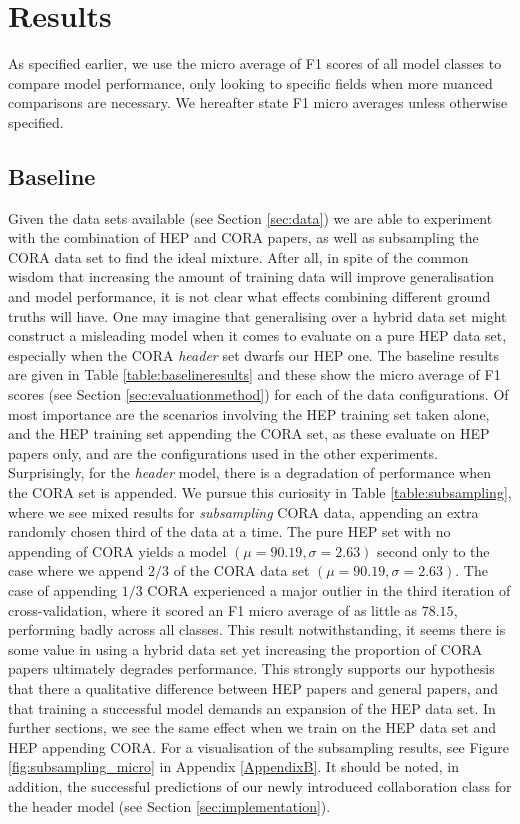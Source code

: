 \section{Results}
\label{sec:results}

As specified earlier, we use the micro average of F1 scores of all model classes to compare model performance, only looking to specific fields when more nuanced comparisons are necessary. We hereafter state F1 micro averages unless otherwise specified.

\subsection{Baseline}
\label{subsec:baslineresults}

Given the data sets available (see Section \ref{sec:data}) we are able to experiment with the combination of HEP and CORA papers, as well as subsampling the CORA data set to find the ideal mixture. After all, in spite of the common wisdom that increasing the amount of training data will improve generalisation and model performance, it is not clear what effects combining different ground truths will have. One may imagine that generalising over a hybrid data set might construct a misleading model when it comes to evaluate on a pure HEP data set, especially when the CORA \emph{header} set dwarfs our HEP one. The baseline results are given in Table \ref{table:baselineresults} and these show the micro average of F1 scores (see Section \ref{sec:evaluationmethod}) for each of the data configurations. Of most importance are the scenarios involving the HEP training set taken alone, and the HEP training set appending the CORA set, as these evaluate on HEP papers only, and are the configurations used in the other experiments. Surprisingly, for the \emph{header} model, there is a degradation of performance when the CORA set is appended. We pursue this curiosity in Table \ref{table:subsampling}, where we see mixed results for \emph{subsampling} CORA data, appending an extra randomly chosen third of the data at a time. The pure HEP set with no appending of CORA yields a model $(\mu = 90.19, \sigma = 2.63)$ second only to the case where we append $2/3$ of the CORA data set $(\mu = 90.19, \sigma = 2.63)$. The case of appending $1/3$ CORA experienced a major outlier in the third iteration of cross-validation, where it scored an F1 micro average of as little as $78.15$, performing badly across all classes. This result notwithstanding, it seems there is some value in using a hybrid data set yet increasing the proportion of CORA papers ultimately degrades performance. This strongly supports our hypothesis that there a qualitative difference between HEP papers and general papers, and that training a successful model demands an expansion of the HEP data set. In further sections, we see the same effect when we train on the HEP data set and HEP appending CORA. For a visualisation of the subsampling results, see Figure \ref{fig:subsampling_micro} in Appendix \ref{AppendixB}. It should be noted, in addition, the successful predictions of our newly introduced collaboration class for the header model (see Section \ref{sec:implementation}).

